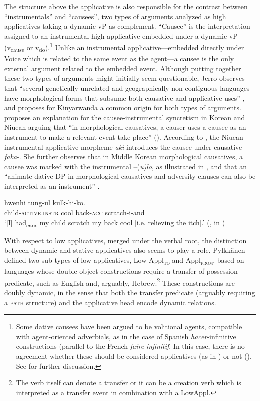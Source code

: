 \documentclass[output=paper,colorlinks,citecolor=brown,nonflat]{./langscibook}
\begin{document}
The structure above the applicative is also responsible for the contrast between “instrumentals” and “causees”, two types of arguments analyzed as high applicatives taking a dynamic vP as complement. “Causee” is the interpretation assigned to an instrumental high applicative embedded under a dynamic vP (v\textsubscript{cause}  or v\textsubscript{do}).\footnote{Some dative causees have been argued to be volitional agents, compatible with agent-oriented adverbials, as in the case of Spanish \textit{hacer}-infinitive constructions (parallel to the French \textit{faire}-\textit{infinitif}. In this case, there is no agreement whether these should be considered applicatives (as in \citealt{Torrego2011}) or not (\citealt{Kim2011high, Tubino2012}). See  for further discussion.} Unlike an instrumental applicative—embedded directly under Voice which is related to the same event as the agent—a causee is the only external argument related to the embedded event. Although putting together these two types of arguments might initially seem questionable, Jerro observes that “several genetically unrelated and geographically non-contiguous languages have morphological forms that subsume both causative and applicative uses” \citep[752]{Jerro2017}, and proposes for Kinyarwanda a common origin for both types of arguments.  \citet{Kim2011high} proposes an explanation for the causee-instrumental syncretism in Korean and Niuean arguing that “in morphological causatives, a causer uses a causee as an instrument to make a relevant event take place” (\citeyear[499]{Kim2011high}). According to \citeauthor{Kim2011high}, the Niuean instrumental applicative morpheme \textit{aki} introduces the causee under causative \textit{faka}-. She further observes that in Middle Korean morphological causatives, a causee was marked with the instrumental –(\textit{u)lo}, as illustrated in , and that an “animate dative DP in morphological causatives and adversity clauses can also be interpreted as an instrument” \citep[499]{Kim2011high}. 

\ea%
    \label{ex:cuervo:5}
     {hwenhi} {tung-ul} {kulk-hi-ko}.\\
    child\textsc{-active.instr} cool back\textsc{-acc} scratch-i-and\\
    \glt ‘[I] had\textsubscript{caus} my child scratch my back cool [i.e. relieving the   itch].’  (\citealt{Park1994}, in \citealt[499]{Kim2011high})
    \z

With respect to low applicatives, merged under the verbal root, the distinction between dynamic and stative applicatives also seems to play a role. Pylkkänen defined two sub-types of low applicatives, Low Appl\textsc{\textsubscript{to}}\textsubscript{} and Appl\textsc{\textsubscript{from}}, based on languages whose double-object constructions require a transfer-of-possession predicate, such as English and, arguably, Hebrew.\footnote{The verb itself can denote a transfer or it can be a creation verb which is interpreted as a transfer event in combination with a LowAppl.}  These constructions are doubly dynamic, in the sense that both the transfer predicate (arguably requiring a \textsc{path} structure) and the applicative head encode dynamic relations.  
\end{document}
